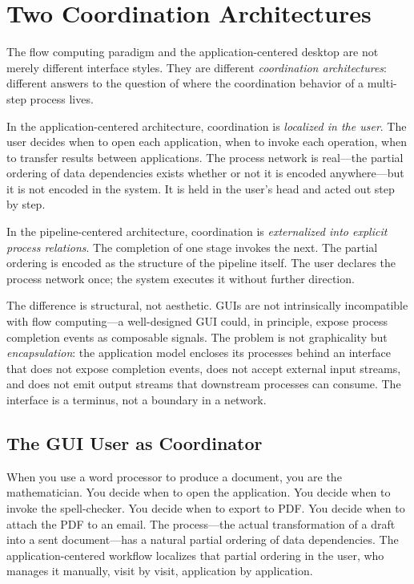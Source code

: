 \documentclass[12pt, a4paper]{article}
\begin{document}
\section{Two Coordination Architectures}

The flow computing paradigm and the application-centered desktop are
not merely different interface styles. They are different
\emph{coordination architectures}: different answers to the question
of where the coordination behavior of a multi-step process lives.

In the application-centered architecture, coordination is
\emph{localized in the user}. The user decides when to open each
application, when to invoke each operation, when to transfer results
between applications. The process network is real---the partial
ordering of data dependencies exists whether or not it is encoded
anywhere---but it is not encoded in the system. It is held in the
user's head and acted out step by step.

In the pipeline-centered architecture, coordination is
\emph{externalized into explicit process relations}. The completion
of one stage invokes the next. The partial ordering is encoded as
the structure of the pipeline itself. The user declares the process
network once; the system executes it without further direction.

The difference is structural, not aesthetic. GUIs are not
intrinsically incompatible with flow computing---a well-designed
GUI could, in principle, expose process completion events as
composable signals. The problem is not graphicality but
\emph{encapsulation}: the application model encloses its processes
behind an interface that does not expose completion events, does not
accept external input streams, and does not emit output streams that
downstream processes can consume. The interface is a terminus, not a
boundary in a network.

\subsection{The GUI User as Coordinator}

When you use a word processor to produce a document, you are the
mathematician. You decide when to open the application. You decide
when to invoke the spell-checker. You decide when to export to PDF.
You decide when to attach the PDF to an email. The process---the
actual transformation of a draft into a sent document---has a natural
partial ordering of data dependencies. The application-centered
workflow localizes that partial ordering in the user, who manages it
manually, visit by visit, application by application.
\end{document}
